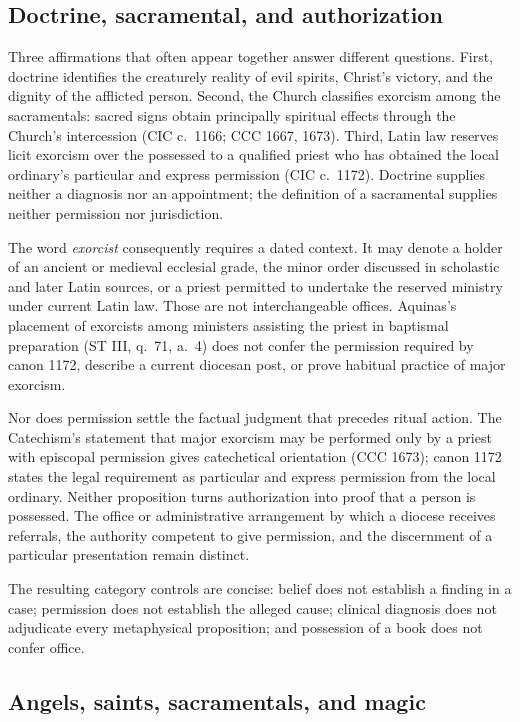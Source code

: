 \subsection{Doctrine, sacramental, and authorization}

Three affirmations that often appear together answer different questions.
First, doctrine identifies the creaturely reality of evil spirits, Christ's
victory, and the dignity of the afflicted person. Second, the Church classifies
exorcism among the sacramentals: sacred signs obtain principally spiritual
effects through the Church's intercession (CIC c.~1166; CCC 1667, 1673).
Third, Latin law reserves licit exorcism over the possessed to a qualified
priest who has obtained the local ordinary's particular and express permission
(CIC c.~1172). Doctrine supplies neither a diagnosis nor an appointment; the
definition of a sacramental supplies neither permission nor jurisdiction.

The word \emph{exorcist} consequently requires a dated context. It may denote a
holder of an ancient or medieval ecclesial grade, the minor order discussed in
scholastic and later Latin sources, or a priest permitted to undertake the
reserved ministry under current Latin law. Those are not interchangeable
offices. Aquinas's placement of exorcists among ministers assisting the priest
in baptismal preparation (ST III, q.~71, a.~4) does not confer the permission
required by canon 1172, describe a current diocesan post, or prove habitual
practice of major exorcism.

Nor does permission settle the factual judgment that precedes ritual action.
The Catechism's statement that major exorcism may be performed only by a priest
with episcopal permission gives catechetical orientation (CCC 1673); canon 1172
states the legal requirement as particular and express permission from the
local ordinary. Neither proposition turns authorization into proof that a
person is possessed. The office or administrative arrangement by which a
diocese receives referrals, the authority competent to give permission, and
the discernment of a particular presentation remain distinct.

The resulting category controls are concise: belief does not establish a
finding in a case; permission does not establish the alleged cause; clinical
diagnosis does not adjudicate every metaphysical proposition; and possession
of a book does not confer office.

\subsection{Angels, saints, sacramentals, and magic}

